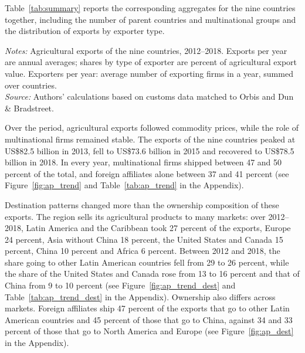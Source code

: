 \documentclass[11pt,a4paper]{article}
\newcommand{\srcnote}{\textit{Source:} Authors' calculations based on customs data matched to Orbis and Dun \& Bradstreet.}
\begin{document}
Table~\ref{tab:summary} reports the corresponding aggregates for the nine countries together,
including the number of parent countries and multinational groups and the distribution of exports
by exporter type.
\begin{table}[H]\centering\small%
  \caption{Agricultural Sample Summary}%
  \label{tab:summary}%
  \par\vspace{3pt}%
  \begin{minipage}{0.95\textwidth}\footnotesize %
  \textit{Notes:} Agricultural exports of the nine countries, 2012--2018. Exports per year are annual averages; shares by type of exporter are percent of agricultural export value. Exporters per year: average number of exporting firms in a year, summed over countries.\\[3pt]%
  \srcnote%
  \end{minipage}%
  \end{table}

Over the period, agricultural exports followed commodity prices, while the role of multinational
firms remained stable. The exports of the nine countries peaked at US\$82.5 billion in 2013, fell
to US\$73.6 billion in 2015 and recovered to US\$78.5 billion in 2018. In every year,
multinational firms shipped between 47 and 50 percent of the total, and foreign affiliates alone
between 37 and 41 percent (see Figure~\ref{fig:ap_trend} and Table~\ref{tab:ap_trend} in the
Appendix).

Destination patterns changed more than the ownership composition of these exports. The region
sells its agricultural products to many markets: over 2012--2018, Latin America and the Caribbean took 27 percent of the
exports, Europe 24 percent, Asia without China 18 percent, the United States and Canada 15 percent,
China 10 percent and Africa 6 percent. Between 2012 and 2018, the share going to other Latin
American countries fell from 29 to 26 percent, while the share of the United States and Canada rose
from 13 to 16 percent and that of China from 9 to 10 percent (see Figure~\ref{fig:ap_trend_dest}
and Table~\ref{tab:ap_trend_dest} in the Appendix). Ownership also differs across markets. Foreign
affiliates ship 47 percent of the exports that go to other Latin American countries and 45 percent
of those that go to China, against 34 and 33 percent of those that go to North America and Europe
(see Figure~\ref{fig:ap_dest} in the Appendix).
\end{document}
